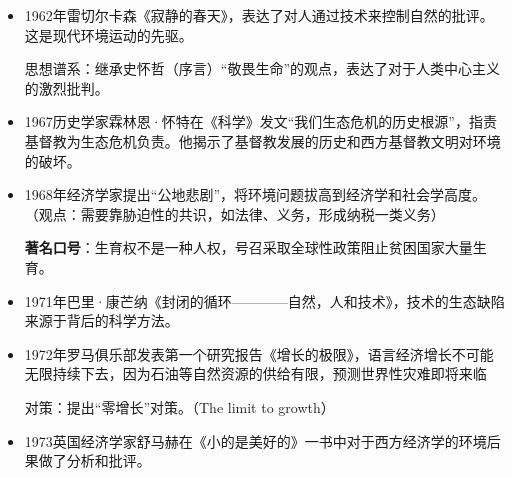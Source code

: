 \documentclass{ctexart}
\begin{document}
\begin{itemize}
    \item 1962年雷切尔卡森《寂静的春天》，表达了对人通过技术来控制自然的批评。这是现代环境运动的先驱。
    
    思想谱系：继承史怀哲（序言）“敬畏生命”的观点，表达了对于人类中心主义的激烈批判。
    \item 1967历史学家霖林恩·怀特在《科学》发文“我们生态危机的历史根源”，指责基督教为生态危机负责。他揭示了基督教发展的历史和西方基督教文明对环境的破坏。
    \item 1968年经济学家提出“公地悲剧”，将环境问题拔高到经济学和社会学高度。（观点：需要靠胁迫性的共识，如法律、义务，形成纳税一类义务）
    
    \textbf{著名口号}：生育权不是一种人权，号召采取全球性政策阻止贫困国家大量生育。
    \item 1971年巴里·康芒纳《封闭的循环————自然，人和技术》，技术的生态缺陷来源于背后的科学方法。
    \item 1972年罗马俱乐部发表第一个研究报告《增长的极限》，语言经济增长不可能无限持续下去，因为石油等自然资源的供给有限，预测世界性灾难即将来临
    
    对策：提出“零增长”对策。（The limit to growth）
    \item 1973英国经济学家舒马赫在《小的是美好的》一书中对于西方经济学的环境后果做了分析和批评。
\end{itemize}
\end{document}
